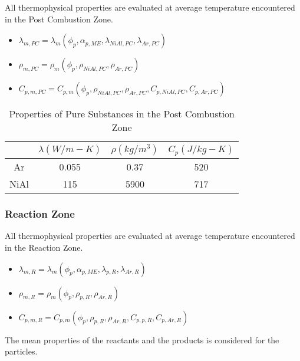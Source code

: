 \documentclass[../main.tex]{subfiles}
\begin{document}
All thermophysical properties are evaluated at average temperature encountered in the Post Combustion Zone.

\begin{itemize}
    \item $\lambda_{m,PC} = \lambda_m \left( \phi_p, \alpha_{p,ME}, \lambda_{NiAl,PC}, \lambda_{Ar,PC} \right)$
    \item $\rho_{m,PC} = \rho_m \left( \phi_p, \rho_{NiAl,PC}, \rho_{Ar,PC} \right)$
    \item $C_{p,m,PC} = C_{p,m} \left( \phi_p, \rho_{NiAl,PC}, \rho_{Ar,PC}, C_{p,NiAl,PC}, C_{p,Ar,PC} \right)$
\end{itemize}

\begin{table}[ht]
    \centering
    \begin{tabular}{c|c|c|c}
         & $\lambda \left( W/m-K \right)$ & $\rho \left( kg/m^3 \right)$ & $C_p \left( J/kg-K \right)$ \\
         \hline
         Ar   & 0.055 & 0.37 & 520  \\
         NiAl & 115   & 5900 & 717  \\
    \end{tabular}
    \caption{Properties of Pure Substances in the Post Combustion Zone}
\end{table}

\subsubsection{Reaction Zone}

All thermophysical properties are evaluated at average temperature encountered in the Reaction Zone.

\begin{itemize}
    \item $\lambda_{m,R} = \lambda_m \left( \phi_p, \alpha_{p,ME}, \lambda_{p,R}, \lambda_{Ar,R} \right)$
    \item $\rho_{m,R} = \rho_m \left( \phi_p, \rho_{p,R}, \rho_{Ar,R} \right)$
    \item $C_{p,m,R} = C_{p,m} \left( \phi_p, \rho_{p,R}, \rho_{Ar,R}, C_{p,p,R}, C_{p,Ar,R} \right)$
\end{itemize}

\noindent The mean properties of the reactants and the products is considered for the particles.
\end{document}

